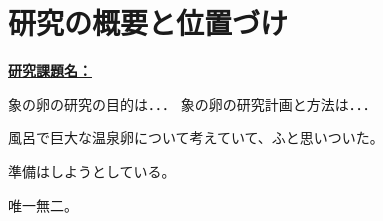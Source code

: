 
\section{研究の概要と位置づけ}

\noindent
\underline{\textbf{研究課題名：}}

	象の卵の研究の目的は．．．	
	象の卵の研究計画と方法は．．．

		風呂で巨大な温泉卵について考えていて、ふと思いついた。

	準備はしようとしている。

	唯一無二。



